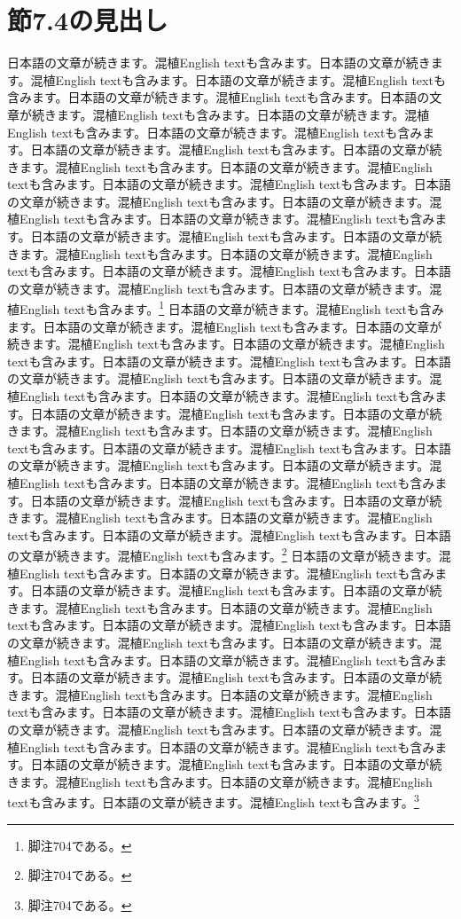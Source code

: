 \documentclass[pdflatex,book]{jlreq}
\begin{document}
\section{節7.4の見出し}
日本語の文章が続きます。混植English textも含みます。日本語の文章が続きます。混植English textも含みます。日本語の文章が続きます。混植English textも含みます。日本語の文章が続きます。混植English textも含みます。日本語の文章が続きます。混植English textも含みます。日本語の文章が続きます。混植English textも含みます。日本語の文章が続きます。混植English textも含みます。日本語の文章が続きます。混植English textも含みます。日本語の文章が続きます。混植English textも含みます。日本語の文章が続きます。混植English textも含みます。日本語の文章が続きます。混植English textも含みます。日本語の文章が続きます。混植English textも含みます。日本語の文章が続きます。混植English textも含みます。日本語の文章が続きます。混植English textも含みます。日本語の文章が続きます。混植English textも含みます。日本語の文章が続きます。混植English textも含みます。日本語の文章が続きます。混植English textも含みます。日本語の文章が続きます。混植English textも含みます。日本語の文章が続きます。混植English textも含みます。日本語の文章が続きます。混植English textも含みます。\footnote{脚注704である。}
日本語の文章が続きます。混植English textも含みます。日本語の文章が続きます。混植English textも含みます。日本語の文章が続きます。混植English textも含みます。日本語の文章が続きます。混植English textも含みます。日本語の文章が続きます。混植English textも含みます。日本語の文章が続きます。混植English textも含みます。日本語の文章が続きます。混植English textも含みます。日本語の文章が続きます。混植English textも含みます。日本語の文章が続きます。混植English textも含みます。日本語の文章が続きます。混植English textも含みます。日本語の文章が続きます。混植English textも含みます。日本語の文章が続きます。混植English textも含みます。日本語の文章が続きます。混植English textも含みます。日本語の文章が続きます。混植English textも含みます。日本語の文章が続きます。混植English textも含みます。日本語の文章が続きます。混植English textも含みます。日本語の文章が続きます。混植English textも含みます。日本語の文章が続きます。混植English textも含みます。日本語の文章が続きます。混植English textも含みます。日本語の文章が続きます。混植English textも含みます。\footnote{脚注704である。}
日本語の文章が続きます。混植English textも含みます。日本語の文章が続きます。混植English textも含みます。日本語の文章が続きます。混植English textも含みます。日本語の文章が続きます。混植English textも含みます。日本語の文章が続きます。混植English textも含みます。日本語の文章が続きます。混植English textも含みます。日本語の文章が続きます。混植English textも含みます。日本語の文章が続きます。混植English textも含みます。日本語の文章が続きます。混植English textも含みます。日本語の文章が続きます。混植English textも含みます。日本語の文章が続きます。混植English textも含みます。日本語の文章が続きます。混植English textも含みます。日本語の文章が続きます。混植English textも含みます。日本語の文章が続きます。混植English textも含みます。日本語の文章が続きます。混植English textも含みます。日本語の文章が続きます。混植English textも含みます。日本語の文章が続きます。混植English textも含みます。日本語の文章が続きます。混植English textも含みます。日本語の文章が続きます。混植English textも含みます。日本語の文章が続きます。混植English textも含みます。\footnote{脚注704である。}
\end{document}
